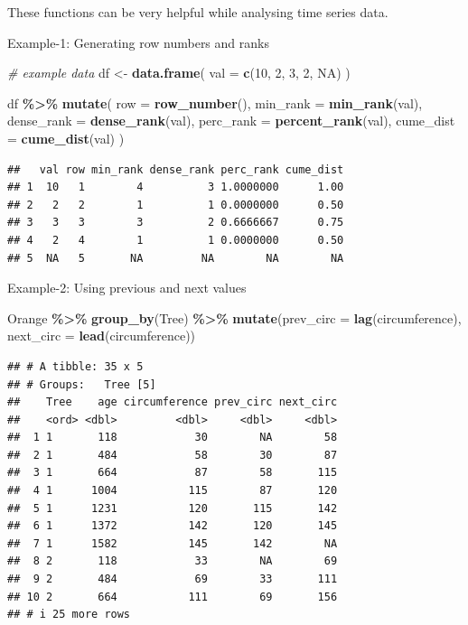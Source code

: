 \documentclass[
]{book}
\newenvironment{Shaded}{\begin{snugshade}}{\end{snugshade}}
\newcommand{\AttributeTok}[1]{\textcolor[rgb]{0.13,0.29,0.53}{#1}}
\newcommand{\CommentTok}[1]{\textcolor[rgb]{0.56,0.35,0.01}{\textit{#1}}}
\newcommand{\ConstantTok}[1]{\textcolor[rgb]{0.56,0.35,0.01}{#1}}
\newcommand{\DecValTok}[1]{\textcolor[rgb]{0.00,0.00,0.81}{#1}}
\newcommand{\FunctionTok}[1]{\textcolor[rgb]{0.13,0.29,0.53}{\textbf{#1}}}
\newcommand{\NormalTok}[1]{#1}
\newcommand{\OtherTok}[1]{\textcolor[rgb]{0.56,0.35,0.01}{#1}}
\newcommand{\SpecialCharTok}[1]{\textcolor[rgb]{0.81,0.36,0.00}{\textbf{#1}}}
\begin{document}
These functions can be very helpful while analysing time series data.

Example-1: Generating row numbers and ranks

\begin{Shaded}
\begin{Highlighting}[]
\CommentTok{\# example data}
\NormalTok{df }\OtherTok{\textless{}{-}} \FunctionTok{data.frame}\NormalTok{(}
  \AttributeTok{val =} \FunctionTok{c}\NormalTok{(}\DecValTok{10}\NormalTok{, }\DecValTok{2}\NormalTok{, }\DecValTok{3}\NormalTok{, }\DecValTok{2}\NormalTok{, }\ConstantTok{NA}\NormalTok{)}
\NormalTok{)}

\NormalTok{df }\SpecialCharTok{\%\textgreater{}\%} 
  \FunctionTok{mutate}\NormalTok{(}
    \AttributeTok{row =} \FunctionTok{row\_number}\NormalTok{(),}
    \AttributeTok{min\_rank =} \FunctionTok{min\_rank}\NormalTok{(val),}
    \AttributeTok{dense\_rank =} \FunctionTok{dense\_rank}\NormalTok{(val),}
    \AttributeTok{perc\_rank =} \FunctionTok{percent\_rank}\NormalTok{(val),}
    \AttributeTok{cume\_dist =} \FunctionTok{cume\_dist}\NormalTok{(val)}
\NormalTok{  )}
\end{Highlighting}
\end{Shaded}

\begin{verbatim}
##   val row min_rank dense_rank perc_rank cume_dist
## 1  10   1        4          3 1.0000000      1.00
## 2   2   2        1          1 0.0000000      0.50
## 3   3   3        3          2 0.6666667      0.75
## 4   2   4        1          1 0.0000000      0.50
## 5  NA   5       NA         NA        NA        NA
\end{verbatim}

Example-2: Using previous and next values

\begin{Shaded}
\begin{Highlighting}[]
\NormalTok{Orange }\SpecialCharTok{\%\textgreater{}\%} 
  \FunctionTok{group\_by}\NormalTok{(Tree) }\SpecialCharTok{\%\textgreater{}\%} 
  \FunctionTok{mutate}\NormalTok{(}\AttributeTok{prev\_circ =} \FunctionTok{lag}\NormalTok{(circumference),}
         \AttributeTok{next\_circ =} \FunctionTok{lead}\NormalTok{(circumference))}
\end{Highlighting}
\end{Shaded}

\begin{verbatim}
## # A tibble: 35 x 5
## # Groups:   Tree [5]
##    Tree    age circumference prev_circ next_circ
##    <ord> <dbl>         <dbl>     <dbl>     <dbl>
##  1 1       118            30        NA        58
##  2 1       484            58        30        87
##  3 1       664            87        58       115
##  4 1      1004           115        87       120
##  5 1      1231           120       115       142
##  6 1      1372           142       120       145
##  7 1      1582           145       142        NA
##  8 2       118            33        NA        69
##  9 2       484            69        33       111
## 10 2       664           111        69       156
## # i 25 more rows
\end{verbatim}
\end{document}
